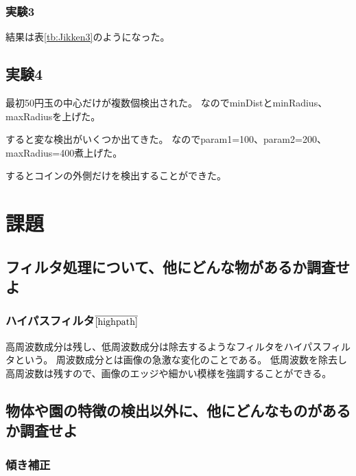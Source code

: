 \documentclass[]{jlreq}
\begin{document}
\subsubsection{実験3}
結果は表\ref{tb:Jikken3}のようになった。
\begin{table}[htbp]
	\centering
	\caption{実験3の結果}
\end{table}

\subsection{実験4}
最初50円玉の中心だけが複数個検出された。
なのでminDistとminRadius、maxRadiusを上げた。

すると変な検出がいくつか出てきた。
なのでparam1=100、param2=200、maxRadius=400煮上げた。

するとコインの外側だけを検出することができた。

\section{課題}
\subsection{フィルタ処理について、他にどんな物があるか調査せよ}
\subsubsection{ハイパスフィルタ\(\overline{\cite{highpath}}\)}
高周波数成分は残し、低周波数成分は除去するようなフィルタをハイパスフィルタという。
周波数成分とは画像の急激な変化のことである。
低周波数を除去し高周波数は残すので、画像のエッジや細かい模様を強調することができる。

\subsection{物体や園の特徴の検出以外に、他にどんなものがあるか調査せよ}
\subsubsection{傾き補正}



\end{document}
